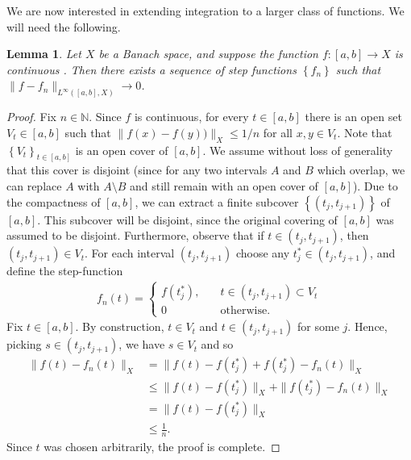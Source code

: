 \documentclass[12pt,reqno]{amsart}
\numberwithin{equation}{section}  %
\numberwithin{figure}{section}
\theoremstyle{plain}
\newtheorem{lemma}{Lemma}
\theoremstyle{definition}
\theoremstyle{remark}
\begin{document}
%
We are now interested in extending integration to a larger class of functions. We will need the
following. %
%
\begin{lemma}
	\label{lem:dense}
	Let $X$ be a Banach space, and
	suppose the function $f:[a,b] \to X$ is continuous . Then
	there exists a sequence of step functions $\left\{ f_n \right\}$
	such that $\|f - f_n\|_{L^\infty( [a,b], X)} \to 0$. 
\end{lemma}
%
%
\begin{proof}
  Fix $n \in \mathbb{N}$. Since $f$ is continuous, for every $t \in
\left[ a,b \right]$ there is an open set $V_t \in [a,b]$ such that
$\|f(x) - f(y)) \|_X \le 1/n$ for all $x, y \in V_t$. Note that $\left\{ V_t
\right\}_{t \in \left[ a,b \right]}$ is an open cover of $[a,b]$. We assume
without loss of generality that this cover is disjoint (since for any two
intervals $A$ and $B$ which overlap, we can replace $A$ with $A \setminus
B$ and still remain with an open cover of $[a,b]$). 
Due to the compactness of $[a,b]$, we can extract
a finite subcover $\left\{ (t_j, t_{j +1}) \right\}$ of $[a,b]$. This subcover
will be disjoint, since the original covering of $[a,b]$ was assumed to be
disjoint. Furthermore,
observe that if $t \in (t_{j}, t_{j+1})$,
then $(t_{j}, t_{j+1}) \in V_{t}$. For each interval $(t_j, t_{j +1})$
choose any $t_{j}^* \in (t_{j}, t_{j +1})$, and define the step-function
%
%
\begin{equation*}
	\begin{split}
		f_n(t) =
		\begin{cases}
      f(t_{j}^{*}), \quad & t \in (t_{j},t_{j+1}) \subset V_{t}
		\\
		0 & \text{otherwise}.
	\end{cases}
	\end{split}
\end{equation*}
%
Fix $t \in [a,b]$. By construction, $t \in V_{t}$ and
$t \in (t_{j}, t_{j+1})$ for some $j$. Hence, picking $s \in (t_{j},
t_{j+1})$, we have $s \in V_{t}$ and so
%
%
\begin{equation*}
	\begin{split}
		\|f(t)-f_n(t)\|_X
    & = \| f(t) - f(t_{j}^{*}) + f(t_{j}^{*}) - f_{n}(t)  \|_{X}
    \\
    & \le \| f(t) - f(t_{j}^{*}) \|_{X} + \| f(t_{j}^{*}) - f_{n}(t) \|_{X}
    \\
    & = \| f(t) - f(t_{j}^{*}) \|_{X}
    \\
    & \le \frac{1}{n}.
	\end{split}
\end{equation*}
%
%
Since $t$ was chosen arbitrarily, the proof is complete. 
\end{proof}
\end{document}
